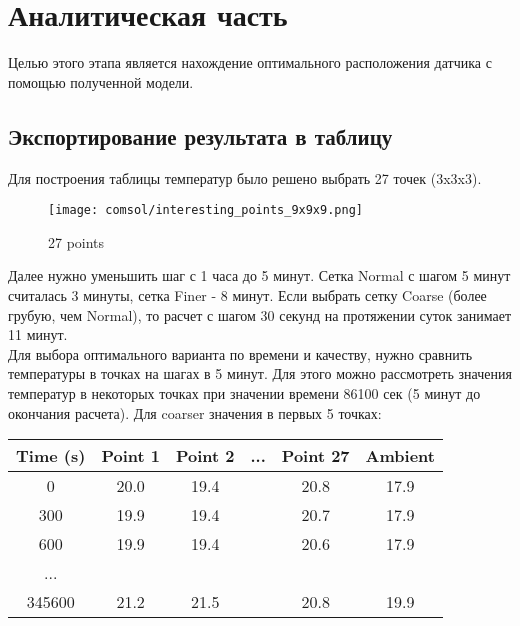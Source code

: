 \graphicspath{{./images/algo}}
\section{Аналитическая часть}

Целью этого этапа является нахождение оптимального расположения датчика с помощью полученной модели.

\subsection{Экспортирование результата в таблицу}


Для построения таблицы температур было решено выбрать 27 точек (3x3x3).

\begin{figure}[H]
\texttt{[image: comsol/interesting\_points\_9x9x9.png]}
\caption{27 points}
\end{figure}

Далее нужно уменьшить шаг с 1 часа до 5 минут. Сетка Normal с шагом 5 минут считалась 3 минуты, сетка Finer - 8 минут. 
Если выбрать сетку Coarse (более грубую, чем Normal), то расчет с шагом 30 секунд на протяжении суток занимает 11 минут.\\
Для выбора оптимального варианта по времени и качеству, нужно сравнить температуры в точках на шагах в 5 минут.
Для этого можно рассмотреть значения температур в некоторых точках при значении времени 86100 сек (5 минут до окончания расчета).
Для coarser значения в первых 5 точках:\\


\begin{table}[H]
\centering
\begin{tabular}{c|c|c|c|c|c}
\textbf{Time (s)} & \textbf{Point 1} & \textbf{Point 2} & ... & \textbf{Point 27} & \textbf{Ambient} \\ \hline
0                 & 20.0             & 19.4             &     & 20.8              & 17.9             \\
300               & 19.9             & 19.4             &     & 20.7              & 17.9             \\
600               & 19.9             & 19.4             &     & 20.6              & 17.9             \\
...               &                  &                  &     &                   &                  \\
345600            & 21.2             & 21.5             &     & 20.8              & 19.9            
\end{tabular}
\end{table}


